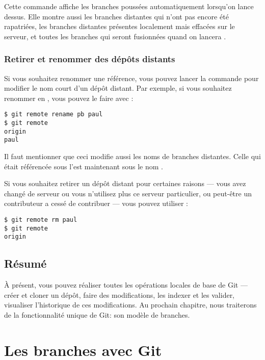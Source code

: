 Cette commande affiche les branches poussées automatiquement lorsqu'on lance  dessus.
Elle montre aussi les branches distantes qui n'ont pas encore été rapatriées, les branches distantes présentes localement mais effacées sur le serveur, et toutes les branches qui seront fusionnées quand on lancera .

\subsubsection{Retirer et renommer des dépôts distants}

Si vous souhaitez renommer une référence, vous pouvez lancer la commande  pour modifier le nom court d'un dépôt distant.
Par exemple, si vous souhaitez renommer  en , vous pouvez le faire avec :
\begin{Schunk}
\begin{Verbatim}
$ git remote rename pb paul
$ git remote
origin
paul
\end{Verbatim}
\end{Schunk}

Il faut mentionner que ceci modifie aussi les noms de branches distantes.
Celle qui était référencée sous  l'est maintenant sous le nom .

Si vous souhaitez retirer un dépôt distant pour certaines raisons --- vous avez changé de serveur ou vous n'utilisez plus ce serveur particulier, ou peut-être un contributeur a cessé de contribuer --- vous pouvez utiliser :
\begin{Schunk}
\begin{Verbatim}
$ git remote rm paul
$ git remote
origin
\end{Verbatim}
\end{Schunk}

\subsection{Résumé}

À présent, vous pouvez réaliser toutes les opérations locales de base de Git --- créer et cloner un dépôt, faire des modifications, les indexer et les valider, visualiser l'historique de ces modifications.
Au prochain chapitre, nous traiterons de la fonctionnalité unique de Git: son modèle de branches.


\section{Les branches avec Git}
\label{sec:git:branching}

